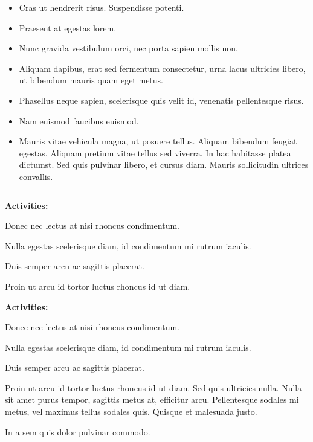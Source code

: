 \documentclass[
]{book}
\begin{document}
\begin{itemize}
\item
  Cras ut hendrerit risus. Suspendisse potenti.
\item
  Praesent at egestas lorem.
\item
  Nunc gravida vestibulum orci, nec porta sapien mollis non.
\item
  Aliquam dapibus, erat sed fermentum consectetur, urna lacus ultricies libero, ut bibendum mauris quam eget metus.
\item
  Phasellus neque sapien, scelerisque quis velit id, venenatis pellentesque risus.
\item
  Nam euismod faucibus euismod.
\item
  Mauris vitae vehicula magna, ut posuere tellus. Aliquam bibendum feugiat egestas. Aliquam pretium vitae tellus sed viverra. In hac habitasse platea dictumst. Sed quis pulvinar libero, et cursus diam. Mauris sollicitudin ultrices convallis.
\end{itemize}

\begin{longtable}[]{@{}l@{}}
\toprule()
\endhead
\bottomrule()
\end{longtable}

\textbf{Activities:}

Donec nec lectus at nisi rhoncus condimentum.

Nulla egestas scelerisque diam, id condimentum mi rutrum iaculis.

Duis semper arcu ac sagittis placerat.

Proin ut arcu id tortor luctus rhoncus id ut diam.

\textbf{Activities:}

Donec nec lectus at nisi rhoncus condimentum.

Nulla egestas scelerisque diam, id condimentum mi rutrum iaculis.

Duis semper arcu ac sagittis placerat.

Proin ut arcu id tortor luctus rhoncus id ut diam. Sed quis ultricies nulla. Nulla sit amet purus tempor, sagittis metus at, efficitur arcu. Pellentesque sodales mi metus, vel maximus tellus sodales quis. Quisque et malesuada justo.

In a sem quis dolor pulvinar commodo.
\end{document}

